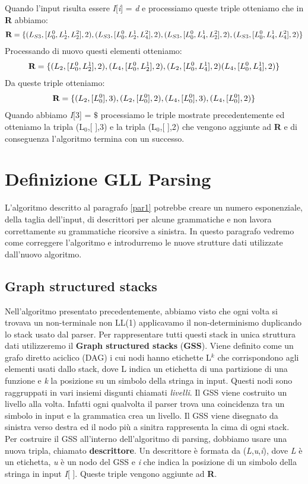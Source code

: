 Quando l'input risulta essere \textit{I}[\textit{i}] = \textit{d} e processiamo queste triple otteniamo che in \textbf{R} abbiamo:
\begin{align}
	\textbf{R} = \{ (L_{S3},[L_0^{0},L_2^{1},L_2^{2}],2), (L_{S3},[L_0^{0},L_2^{1},L_4^{2}],2),  (L_{S3},[L_0^{0},L_4^{1},L_2^{2}],2), (L_{S3},[L_0^{0},L_4^{1},L_4^{2}],2) \} \notag
\end{align}
Processando di nuovo questi elementi otteniamo:
\begin{align}
	\textbf{R} = \{ (L_{2},[L_0^{0},L_2^{1}],2), (L_{4},[L_0^{0},L_2^{1}],2), (L_{2},[L_0^{0},L_4^{1}],2) (L_{4},[L_0^{0},L_4^{1}],2) \} \notag
\end{align}
Da queste triple otteniamo:
\begin{align}
 	\textbf{R} = \{ (L_{2},[L_0^{0}],3), (L_{2},[L_0^{0}],2), (L_{4},[L_0^{0}],3), (L_{4},[L_0^{0}],2) \} \notag
\end{align}
Quando abbiamo \textit{I}[3] = $\$$ processiamo le triple mostrate precedentemente ed otteniamo la tripla (L$_{0}$,[ ],3) e la tripla (L$_{0}$,[ ],2) che vengono aggiunte ad \textbf{R} e di conseguenza l'algoritmo termina con un successo.
\section{Definizione GLL Parsing}
L'algoritmo descritto al paragrafo \ref{par1} potrebbe creare un numero esponenziale, della taglia dell'input, di descrittori per alcune grammatiche e non lavora correttamente su grammatiche ricorsive a sinistra. In questo paragrafo vedremo come correggere l'algoritmo e introdurremo le nuove strutture dati utilizzate dall'nuovo algoritmo.
\subsection{Graph structured stacks}
Nell'algoritmo presentato precedentemente, abbiamo visto che ogni volta si trovava un non-terminale non LL(1) applicavamo il non-determinismo duplicando lo stack usato dal parser. Per rappresentare tutti questi stack in unica struttura dati utilizzeremo il \textbf{Graph structured stacks} (\textbf{GSS}). Viene definito \cite{tesi: lr} come un grafo diretto aciclico (DAG) i cui nodi hanno etichette L$^{k}$ che corrispondono agli elementi usati dallo stack, dove L indica un etichetta di una partizione di una funzione e \textit{k} la posizione su un simbolo della stringa in input. Questi nodi sono raggruppati in vari insiemi disgunti chiamati \textit{livelli}. Il GSS viene costruito un livello alla volta. Infatti ogni qualvolta il parser trova una coincidenza tra un simbolo in input e la grammatica crea un livello. Il GSS viene disegnato da sinistra verso destra ed il nodo più a sinitra rappresenta la cima di ogni stack. Per costruire il GSS all'interno dell'algoritmo di parsing, dobbiamo usare una nuova tripla, chiamato \textbf{descrittore}. Un descrittore è formata da (\textit{L},\textit{u},\textit{i}), dove \textit{L} è un etichetta, \textit{u} è un nodo del GSS e \textit{i} che indica la posizione di un simbolo della stringa in input \textit{I}[ ]. Queste triple vengono aggiunte ad \textbf{R}.
